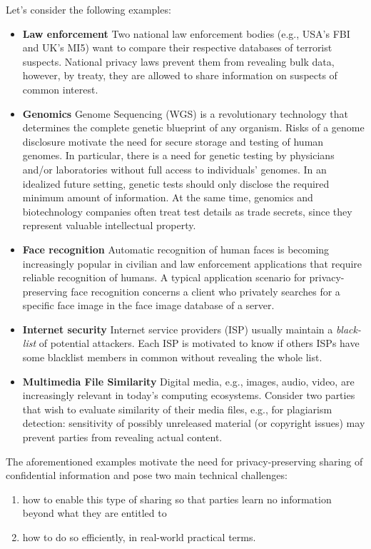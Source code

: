 \documentclass[dvips,12pt]{article}
\begin{document}
Let's consider the following examples:
\begin{itemize}
\item \textbf{Law enforcement} Two national law enforcement bodies (e.g., USA’s FBI and UK’s MI5) want to compare their respective databases of terrorist suspects. National privacy laws prevent them from revealing bulk data, however, by treaty, they are allowed to share information on suspects of common interest.
\item \textbf{Genomics} Genome Sequencing (WGS) is a revolutionary technology that determines the complete genetic blueprint of any organism. Risks of a genome disclosure motivate the need for secure storage and testing of human genomes. In particular, there is a need for genetic testing by physicians and/or laboratories without full access to individuals' genomes. In an idealized future setting, genetic tests should only disclose the required minimum amount of information. At the same time, genomics and biotechnology companies often treat test details as trade secrets, since they represent valuable intellectual property.
\item \textbf{Face recognition} Automatic recognition of human faces is becoming increasingly popular in civilian and law enforcement applications that require reliable recognition of humans. A typical application scenario for privacy-preserving face recognition concerns a client who privately searches for a specific face image in the face image database of a server.
\item \textbf{Internet security} Internet service providers (ISP) usually maintain a \emph{black-list} of potential attackers. Each ISP is motivated to know if others ISPs have some blacklist members in common without revealing the whole list.
\item \textbf{Multimedia File Similarity} Digital media, e.g., images, audio, video, are increasingly relevant in today’s computing ecosystems. Consider two parties that wish to evaluate similarity of their media files, e.g., for plagiarism detection: sensitivity of possibly unreleased material (or copyright issues) may prevent parties from revealing actual content. 
\end{itemize} 

The aforementioned examples motivate the need for privacy-preserving sharing of confidential information
and pose two main technical challenges: 
\begin{enumerate}
\item how to enable this type of sharing so that parties learn no information beyond what they are entitled to
\item how to do so efficiently, in real-world practical terms.
\end{enumerate} 
\end{document}
